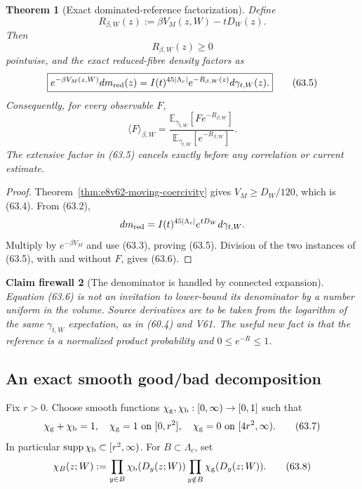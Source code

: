 \documentclass[11pt,oneside]{book}
\newtheorem{theorem}{Theorem}[chapter]
\newtheorem{firewall}[theorem]{Claim firewall}
\theoremstyle{definition}
\theoremstyle{remark}
\begin{document}
\begin{theorem}[Exact dominated-reference factorization]
\label{thm:e8v63-dominated-reference}
Define
\[
 R_{\beta,W}(z):=\beta V_M(z,W)-tD_W(z).                     \tag{63.3}
\]
Then
\[
                         R_{\beta,W}(z)\ge0                  \tag{63.4}
\]
pointwise, and the exact reduced-fibre density factors as
\[
\boxed{
 e^{-\beta V_M(z,W)}dm_{\rm red}(z)
 =I(t)^{45|\Lambda_c|}
  e^{-R_{\beta,W}(z)}d\gamma_{t,W}(z).}                      \tag{63.5}
\]
Consequently, for every observable \(F\),
\[
 \langle F\rangle_{\beta,W}
 =\frac{\mathbb E_{\gamma_{t,W}}
       [F e^{-R_{\beta,W}}]}
       {\mathbb E_{\gamma_{t,W}}[e^{-R_{\beta,W}}]}.        \tag{63.6}
\]
The extensive factor in (63.5) cancels exactly before any
correlation or current estimate.
\end{theorem}

\begin{proof}
Theorem~\ref{thm:e8v62-moving-coercivity} gives
\(V_M\ge D_W/120\), which is (63.4).  From (63.2),
\[
 dm_{\rm red}
 =I(t)^{45|\Lambda_c|}e^{tD_W}d\gamma_{t,W}.
\]
Multiply by \(e^{-\beta V_M}\) and use (63.3), proving (63.5).
Division of the two instances of (63.5), with and without \(F\),
gives (63.6).
\end{proof}

\begin{firewall}[The denominator is handled by connected expansion]
\label{fire:e8v63-no-denominator-bound}
Equation (63.6) is not an invitation to lower-bound its denominator
by a number uniform in the volume.  Source derivatives are to be
taken from the logarithm of the same \(\gamma_{t,W}\) expectation,
as in (60.4) and V61.  The useful new fact is that the reference is a
normalized product probability and \(0\le e^{-R}\le1\).
\end{firewall}

\subsection{An exact smooth good/bad decomposition}

Fix \(r>0\).  Choose smooth functions
\(\chi_{\rm g},\chi_{\rm b}:[0,\infty)\to[0,1]\) such that
\[
 \chi_{\rm g}+\chi_{\rm b}=1,
 \quad \chi_{\rm g}=1\ \hbox{on }[0,r^2],
 \quad \chi_{\rm g}=0\ \hbox{on }[4r^2,\infty).            \tag{63.7}
\]
In particular
\(\operatorname{supp}\chi_{\rm b}\subset[r^2,\infty)\).
For \(B\subset\Lambda_c\), set
\[
 \chi_B(z;W):=
 \prod_{y\in B}\chi_{\rm b}(D_y(z;W))
 \prod_{y\notin B}\chi_{\rm g}(D_y(z;W)).                  \tag{63.8}
\]
\end{document}
